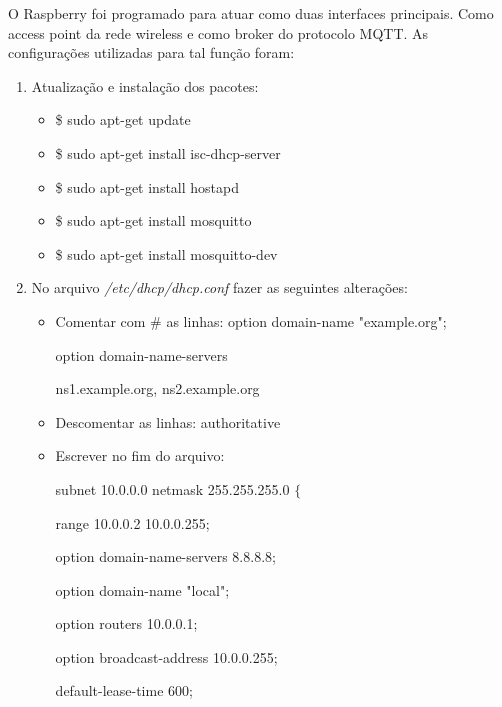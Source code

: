 O Raspberry foi programado para atuar como duas interfaces principais. Como access point da rede wireless e como broker do protocolo MQTT. As configurações utilizadas para tal função foram:

\begin{enumerate}
    \item Atualização e instalação dos pacotes:
        \begin{itemize}
            \item \$ sudo apt-get update
            \item \$ sudo apt-get install isc-dhcp-server
            \item \$ sudo apt-get install hostapd
            \item \$ sudo apt-get install mosquitto
            \item \$ sudo apt-get install mosquitto-dev
        \end{itemize}

    \item No arquivo \textit{/etc/dhcp/dhcp.conf} fazer as seguintes alterações:
        \begin{itemize}
            \item Comentar com \# as linhas:
                option domain-name "example.org";

                option domain-name-servers

                ns1.example.org, ns2.example.org
            \item Descomentar as linhas:
                authoritative
            \item Escrever no fim do arquivo:

                subnet 10.0.0.0 netmask 255.255.255.0 $\{$

                \hspace*{6mm}    range 10.0.0.2 10.0.0.255;

                \hspace*{6mm}    option domain-name-servers 8.8.8.8;

                \hspace*{6mm}    option domain-name "local";

                \hspace*{6mm}    option routers 10.0.0.1;

                \hspace*{6mm}    option broadcast-address 10.0.0.255;

                \hspace*{6mm}    default-lease-time 600;


\end{itemize}
\end{enumerate}
